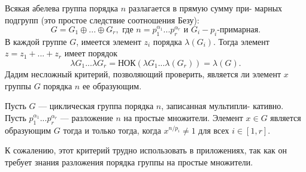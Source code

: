 Всякая абелева группа порядка $n$ разлагается в прямую сумму при-\linebreak
марных подгрупп (это простое следствие соотношения Безу):\linebreak
$$G = G_1\oplus...\oplus G_r, \text{ где } n=p_1^{\alpha_1}...p_r^{\alpha_r} \text{ и } G_i - p_i \text{-примарная}.$$
В каждой группе $G$, имеется элемент $z_i$ порядка $\lambda(G_i)$. Тогда элемент\linebreak
$z=z_1+...+z_r$ имеет порядок
$$\lambda{G_1}...\lambda{G_r} = \text{НОК}(\lambda{G_1}...\lambda(G_r)) = \lambda(G).$$
\newpage
Дадим несложный критерий, позволяющий проверить, является ли\linebreak
элемент $x$ группы $G$ порядка $n$ ее образующим.
\begin{predl}
Пусть $G$ — циклическая группа порядка $n$, записанная мультипли­-\linebreak
кативно. Пусть $p_1^{\alpha_1}...p_r^{\alpha_r}$ — разложение $n$ на простые множители.\linebreak
Элемент $x \in G$ является образующим $G$ тогда и только тогда, когда\linebreak
$x^{n/p_i} \ne 1$ для всех $i \in [1, r]$.

К сожалению, этот критерий трудно использовать в приложениях,\linebreak
так как он требует знания разложения порядка группы на простые\linebreak
множители.
\end{predl}

